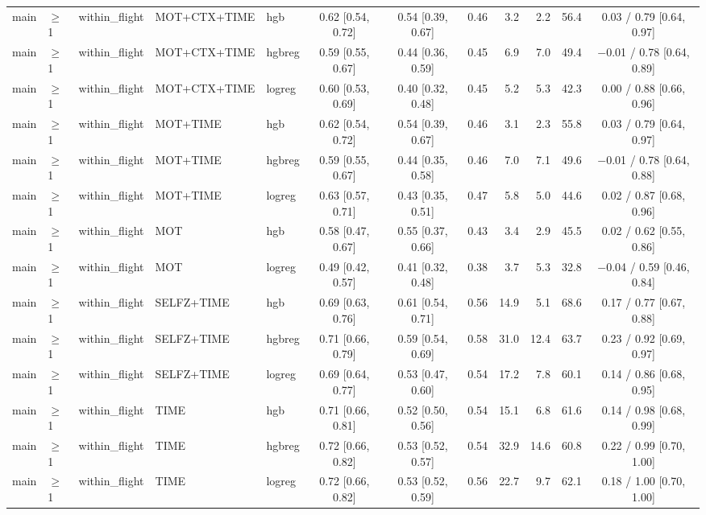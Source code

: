 \begin{longtable}{@{}lllllcccrrrc@{}}
main & $\geq$1 & within\_flight & MOT+CTX+TIME & hgb & 0.62 [0.54, 0.72] & 0.54 [0.39, 0.67] & 0.46 & 3.2 & 2.2 & 56.4 & 0.03 / 0.79 [0.64, 0.97] \\
main & $\geq$1 & within\_flight & MOT+CTX+TIME & hgbreg & 0.59 [0.55, 0.67] & 0.44 [0.36, 0.59] & 0.45 & 6.9 & 7.0 & 49.4 & $-$0.01 / 0.78 [0.64, 0.89] \\
main & $\geq$1 & within\_flight & MOT+CTX+TIME & logreg & 0.60 [0.53, 0.69] & 0.40 [0.32, 0.48] & 0.45 & 5.2 & 5.3 & 42.3 & 0.00 / 0.88 [0.66, 0.96] \\
main & $\geq$1 & within\_flight & MOT+TIME & hgb & 0.62 [0.54, 0.72] & 0.54 [0.39, 0.67] & 0.46 & 3.1 & 2.3 & 55.8 & 0.03 / 0.79 [0.64, 0.97] \\
main & $\geq$1 & within\_flight & MOT+TIME & hgbreg & 0.59 [0.55, 0.67] & 0.44 [0.35, 0.58] & 0.46 & 7.0 & 7.1 & 49.6 & $-$0.01 / 0.78 [0.64, 0.88] \\
main & $\geq$1 & within\_flight & MOT+TIME & logreg & 0.63 [0.57, 0.71] & 0.43 [0.35, 0.51] & 0.47 & 5.8 & 5.0 & 44.6 & 0.02 / 0.87 [0.68, 0.96] \\
main & $\geq$1 & within\_flight & MOT & hgb & 0.58 [0.47, 0.67] & 0.55 [0.37, 0.66] & 0.43 & 3.4 & 2.9 & 45.5 & 0.02 / 0.62 [0.55, 0.86] \\
main & $\geq$1 & within\_flight & MOT & logreg & 0.49 [0.42, 0.57] & 0.41 [0.32, 0.48] & 0.38 & 3.7 & 5.3 & 32.8 & $-$0.04 / 0.59 [0.46, 0.84] \\
main & $\geq$1 & within\_flight & SELFZ+TIME & hgb & 0.69 [0.63, 0.76] & 0.61 [0.54, 0.71] & 0.56 & 14.9 & 5.1 & 68.6 & 0.17 / 0.77 [0.67, 0.88] \\
main & $\geq$1 & within\_flight & SELFZ+TIME & hgbreg & 0.71 [0.66, 0.79] & 0.59 [0.54, 0.69] & 0.58 & 31.0 & 12.4 & 63.7 & 0.23 / 0.92 [0.69, 0.97] \\
main & $\geq$1 & within\_flight & SELFZ+TIME & logreg & 0.69 [0.64, 0.77] & 0.53 [0.47, 0.60] & 0.54 & 17.2 & 7.8 & 60.1 & 0.14 / 0.86 [0.68, 0.95] \\
main & $\geq$1 & within\_flight & TIME & hgb & 0.71 [0.66, 0.81] & 0.52 [0.50, 0.56] & 0.54 & 15.1 & 6.8 & 61.6 & 0.14 / 0.98 [0.68, 0.99] \\
main & $\geq$1 & within\_flight & TIME & hgbreg & 0.72 [0.66, 0.82] & 0.53 [0.52, 0.57] & 0.54 & 32.9 & 14.6 & 60.8 & 0.22 / 0.99 [0.70, 1.00] \\
main & $\geq$1 & within\_flight & TIME & logreg & 0.72 [0.66, 0.82] & 0.53 [0.52, 0.59] & 0.56 & 22.7 & 9.7 & 62.1 & 0.18 / 1.00 [0.70, 1.00] \\

\end{longtable}
